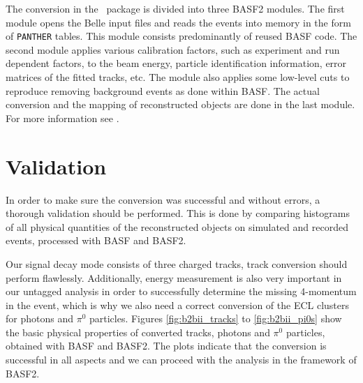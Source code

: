 The conversion in the \btbii~package is divided into three BASF2 modules. The first module opens the Belle input files and reads the events into memory in the form of \texttt{PANTHER} tables. This module consists predominantly of reused BASF code. The second module applies various calibration factors, such as experiment and run dependent factors, to the beam energy, particle identification information, error matrices of the fitted tracks, etc. The module also applies some low-level cuts to reproduce removing background events as done within BASF. The actual conversion and the mapping of reconstructed objects are done in the last module. For more information see \cite{Keck:48940}.

\section{Validation}

In order to make sure the conversion was successful and without errors, a thorough validation should be performed. This is done by comparing histograms of all physical quantities of the reconstructed objects on simulated and recorded events, processed with BASF and BASF2. 

Our signal decay mode consists of three charged tracks, track conversion should perform flawlessly. Additionally, energy measurement is also very important in our untagged analysis in order to successfully determine the missing 4-momentum in the event, which is why we also need a correct conversion of the ECL clusters for photons and $\pi^0$ particles. Figures \ref{fig:b2bii_tracks} to \ref{fig:b2bii_pi0s} show the basic physical properties of converted tracks, photons and $\pi^0$ particles, obtained with BASF and BASF2. The plots indicate that the conversion is successful in all aspects and we can proceed with the analysis in the framework of BASF2.

